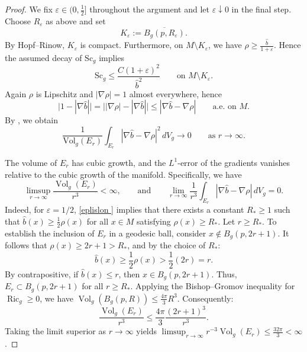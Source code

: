 \documentclass[12pt,oneside,a4paper]{article}
\theoremstyle{mytheorem}
\theoremstyle{remark}
\begin{document}
\begin{proof}
We fix \(\varepsilon \in (0,\tfrac12]\) throughout the argument and let \(\varepsilon \downarrow 0\) in the final step. Choose \(R_\varepsilon\) as above and set
\[
K_\varepsilon := \overline{B_g(p, R_\varepsilon)}.
\]
By Hopf--Rinow, $K_\varepsilon$ is compact. Furthermore,  on $M\setminus K_\varepsilon$,
we have $\rho\ge \frac{\widehat b}{1+\varepsilon}.$
Hence the assumed decay of $\mathrm{Sc}_g$ implies
\begin{equation}\label{eq:Sc-bhat}
\mathrm{Sc}_g\le \frac{C(1+\varepsilon)^2}{\widehat b^2}
\qquad\text{on }M\setminus K_\varepsilon.
\end{equation}
Again $\rho$ is Lipschitz and $|\nabla \rho|=1$ almost everywhere, hence
\begin{equation}\label{a.e}
\bigl|1-|\nabla \widehat b|\bigr|
=
\bigl||\nabla \rho|-|\nabla \widehat b|\bigr|
\le
|\nabla \widehat b-\nabla \rho|
\qquad\text{a.e. on }M.
\end{equation}
By \cite[Lemma~2.3]{zbMATH07177335}, we obtain
\begin{equation}\label{eq:L2}
\frac{1}{\mathrm{Vol}_g(E_r)}
\int_{E_r}|\nabla \widehat b-\nabla \rho|^2\,dV_g\longrightarrow 0
\qquad\text{as }r\to\infty.
\end{equation}

The volume of $E_r$ has cubic growth, and  the $L^1$-error of the gradients vanishes relative to the cubic growth of the manifold. Specifically, we have
\begin{equation}\label{L1}
\limsup_{r \to \infty} \frac{\operatorname{Vol}_g(E_r)}{r^3} < \infty,
\qquad \text{and} \qquad
\lim_{r \to \infty} \frac{1}{r^3} \int_{E_r} |\nabla \widehat{b} - \nabla \rho| \, dV_g = 0.
 \end{equation}
Indeed, for  $\varepsilon = 1/2$, \eqref{eplislon }  implies that there exists a constant $R_* \ge 1$ such that $\widehat{b}(x) \ge \frac{1}{2}\rho(x)$ for all $x \in M$ satisfying $\rho(x) \ge R_*$. Let $r \ge R_*$. To establish the inclusion of $E_r$ in a geodesic ball, consider $x \notin B_g(p, 2r+1)$. It follows that $\rho(x) \ge 2r+1 > R_*$, and by the choice of $R_*$:$$\widehat{b}(x) \ge \frac{1}{2}\rho(x) > \frac{1}{2}(2r) = r.$$By contrapositive, if $\widehat{b}(x) \le r$, then $x \in B_g(p, 2r+1)$. Thus, $E_r \subset B_g(p, 2r+1)$ for all $r \ge R_*$. Applying the Bishop–Gromov inequality for $\operatorname{Ric}_g \ge 0$, we have $\operatorname{Vol}_g(B_g(p, R)) \le \frac{4\pi}{3}R^3$. Consequently:$$\frac{\operatorname{Vol}_g(E_r)}{r^3} \le \frac{4\pi}{3} \frac{(2r+1)^3}{r^3}.$$Taking the limit superior as $r \to \infty$ yields $\limsup_{r \to \infty} r^{-3}\operatorname{Vol}_g(E_r) \le \frac{32\pi}{3} < \infty$.


\end{proof}
\end{document}
